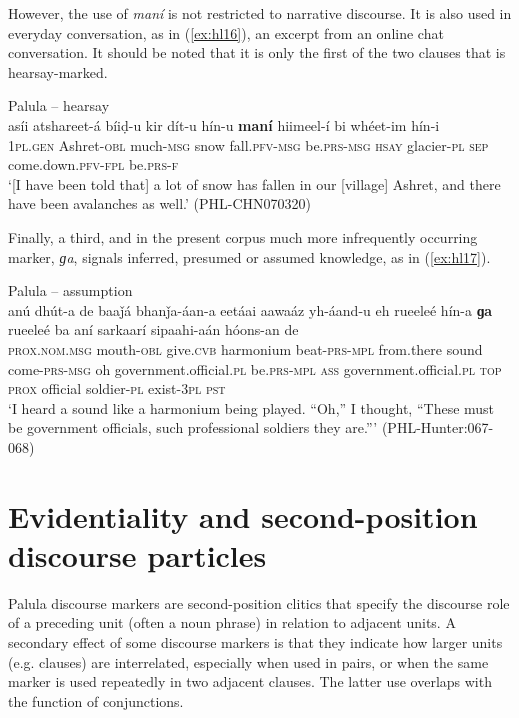 \documentclass[output=paper]{langsci/langscibook}
\begin{document}
However, the use of \textit{maní} is not restricted to narrative discourse. It is also used in everyday conversation, as in ‎(\ref{ex:hl16}), an excerpt from an online chat conversation. It should be noted that it is only the first of the two clauses that is hearsay-marked.

\begin{exe}
	\ex Palula -- hearsay \label{ex:hl16}\\
	\gll asíi atshareet-á bíiḍ-u kir dít-u hín-u \textbf{maní} hiimeel-í bi whéet-im hín-i\\
	1\textsc{pl}.\textsc{gen} Ashret-\textsc{obl} much-\textsc{msg} snow fall.\textsc{pfv}-\textsc{msg} be.\textsc{prs}-\textsc{msg} \textsc{hsay} glacier-\textsc{pl} \textsc{sep} come.down.\textsc{pfv}-\textsc{fpl} be.\textsc{prs}-\textsc{f}\\
	\trans ‘[I have been told that] a lot of snow has fallen in our [village] Ashret, and there have been avalanches as well.’ (PHL-CHN070320)
\end{exe}

Finally, a third, and in the present corpus much more infrequently occurring marker, \textit{ɡa}, signals inferred, presumed or assumed knowledge, as in ‎(\ref{ex:hl17}).

\begin{exe}
	\ex Palula -- assumption \label{ex:hl17}\\
	\gll anú dhút-a de baaǰá bhanǰa-áan-a eetáai aawaáz yh-áand-u eh rueeleé hín-a \textbf{ɡa} rueeleé ba aní sarkaarí sipaahi-aán hóons-an de\\
	\textsc{prox}.\textsc{nom}.\textsc{msg} mouth-\textsc{obl} give.\textsc{cvb} harmonium beat-\textsc{prs}-\textsc{mpl} from.there sound come-\textsc{prs}-\textsc{msg} oh government.official.\textsc{pl} be.\textsc{prs}-\textsc{mpl} \textsc{ass} government.official.\textsc{pl} \textsc{top} \textsc{prox} official soldier-\textsc{pl} exist-3\textsc{pl} \textsc{pst}\\
	\trans ‘I heard a sound like a harmonium being played. “Oh,” I thought, “These must be government officials, such professional soldiers they are.”’ (PHL-Hunter:067-068)
\end{exe}


\section{Evidentiality and second-position discourse particles}\label{s:hl5}

Palula discourse markers are second-position clitics that specify the discourse role of a preceding unit (often a noun phrase) in relation to adjacent units. A secondary effect of some discourse markers is that they indicate how larger units (e.g. clauses) are interrelated, especially when used in pairs, or when the same marker is used repeatedly in two adjacent clauses. The latter use overlaps with the function of conjunctions.
 
\end{document}
